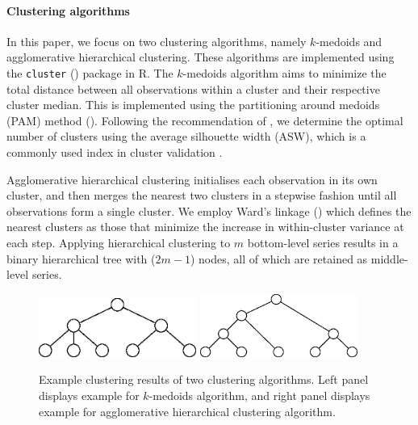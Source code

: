 \documentclass[a4paper,review,12pt,authoryear]{elsarticle}
\begin{document}
\paragraph{\textbf{Clustering algorithms}}
In this paper, we focus on two clustering algorithms, namely $k$-medoids and agglomerative hierarchical clustering. These algorithms are implemented using the \texttt{cluster} (\citealp{cluster}) package in R. {The $k$-medoids algorithm aims to minimize the total distance between all observations within a cluster and their respective cluster median.} This is implemented using the partitioning around medoids (PAM) method (\citealp{PartitioningMedoidsProgram1990}).
Following the recommendation of \cite{PartitioningMedoidsProgram1990}, we determine the optimal number of clusters using the average silhouette width (ASW), which is a commonly used index in cluster validation \citep[see \textit{e.g.}, ][]{shutaywi2021silhouette}.

Agglomerative hierarchical clustering initialises each observation in its own cluster, and then merges the nearest two clusters in a stepwise fashion until all observations form a single cluster. We employ Ward's linkage (\citealp{murtaghWardHierarchicalAgglomerative2014a}) which defines the nearest clusters as those that minimize the increase in within-cluster variance at each step. Applying hierarchical clustering to $m$ bottom-level series results in a binary hierarchical tree with ($2m-1$) nodes, all of which are retained as middle-level series. 

\begin{figure}[h!]
    \centering
    \includegraphics[width=0.46\textwidth]{../figures/Figure1_left.jpg}
    \hspace{1cm}
    \includegraphics[width=0.46\textwidth]{../figures/Figure1_right.jpg}
    \caption{\label{fig:cluster_example}Example clustering results of two clustering algorithms. Left panel displays example for $k$-medoids algorithm, and right panel displays example for agglomerative hierarchical clustering algorithm.}
\end{figure}
\end{document}
